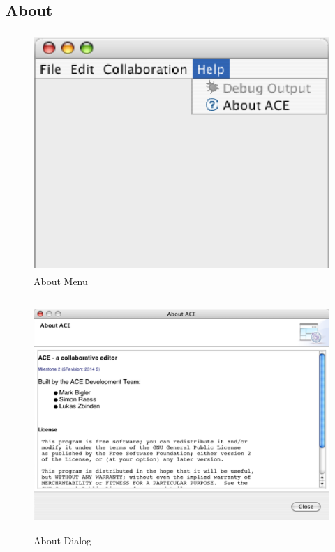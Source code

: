 \documentclass[11pt,a4paper]{article}
\begin{document}
\subsection{About}
\begin{figure}[H]
\begin{center}
  \includegraphics[height=3.56in, width=4.56in]{../images/usermanual/menu_help.eps}
\caption{About Menu}
\label{default}
\end{center}
\end{figure}

\begin{figure}[H]
\begin{center}
  \includegraphics[height=3.48in, width=4.87in]{../images/usermanual/ace_about.eps}
\caption{About Dialog}
\label{default}
\end{center}
\end{figure}
\end{document}
